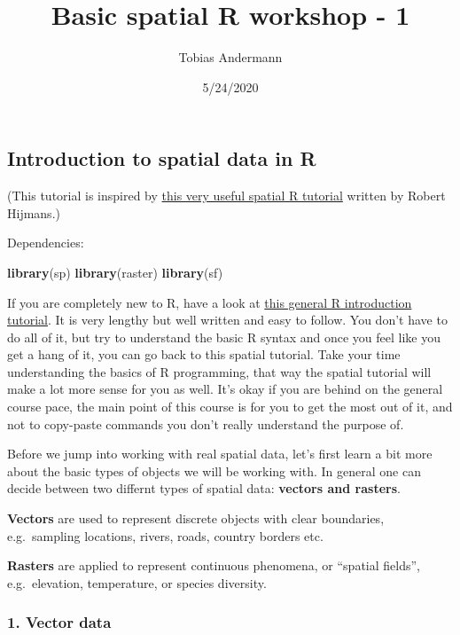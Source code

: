 \documentclass[]{article}
\title{Basic spatial R workshop - 1}
\author{Tobias Andermann}
\date{5/24/2020}
\newenvironment{Shaded}{\begin{snugshade}}{\end{snugshade}}
\newcommand{\KeywordTok}[1]{\textcolor[rgb]{0.13,0.29,0.53}{\textbf{#1}}}
\newcommand{\NormalTok}[1]{#1}
\begin{document}
\maketitle

\hypertarget{introduction-to-spatial-data-in-r}{%
\subsection{Introduction to spatial data in
R}\label{introduction-to-spatial-data-in-r}}

(This tutorial is inspired by
\href{http://rspatial.org/spatial/index.html}{this very useful spatial R
tutorial} written by Robert Hijmans.)

Dependencies:

\begin{Shaded}
\begin{Highlighting}[]
\KeywordTok{library}\NormalTok{(sp)}
\KeywordTok{library}\NormalTok{(raster)}
\KeywordTok{library}\NormalTok{(sf)}
\end{Highlighting}
\end{Shaded}

If you are completely new to R, have a look at
\href{https://rspatial.org/intr/index.html}{this general R introduction
tutorial}. It is very lengthy but well written and easy to follow. You
don't have to do all of it, but try to understand the basic R syntax and
once you feel like you get a hang of it, you can go back to this spatial
tutorial. Take your time understanding the basics of R programming, that
way the spatial tutorial will make a lot more sense for you as well.
It's okay if you are behind on the general course pace, the main point
of this course is for you to get the most out of it, and not to
copy-paste commands you don't really understand the purpose of.

Before we jump into working with real spatial data, let's first learn a
bit more about the basic types of objects we will be working with. In
general one can decide between two differnt types of spatial data:
\textbf{vectors and rasters}.

\textbf{Vectors} are used to represent discrete objects with clear
boundaries, e.g.~sampling locations, rivers, roads, country borders etc.

\textbf{Rasters} are applied to represent continuous phenomena, or
``spatial fields'', e.g.~elevation, temperature, or species diversity.

\hypertarget{vector-data}{%
\subsubsection{1. Vector data}\label{vector-data}}
\end{document}
